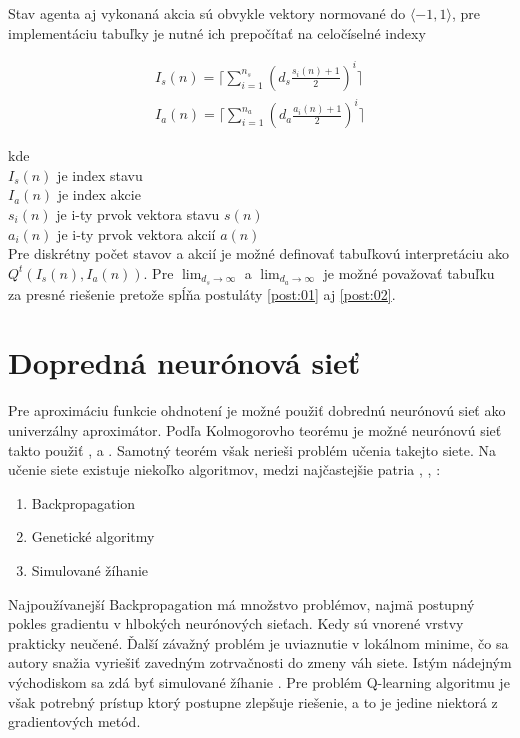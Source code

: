 Stav agenta aj vykonaná akcia sú obvykle vektory normované do $\langle -1, 1 \rangle$,
pre implementáciu tabuľky je nutné ich prepočítať na celočíselné indexy

\begin{align}
  I_s(n) = \lceil \sum\limits_{i=1}^{n_s} {\left( d_s\frac{s_i(n) + 1}{2} \right)^i \rceil}  \\
  I_a(n) = \lceil \sum\limits_{i=1}^{n_a} {\left( d_a\frac{a_i(n) + 1}{2} \right)^i \rceil}
\end{align}

kde \\
$I_s(n)$ je index stavu \\
$I_a(n)$ je index akcie \\
$s_i(n)$ je i-ty prvok vektora stavu $s(n)$ \\
$a_i(n)$ je i-ty prvok vektora akcií $a(n)$ \\

Pre diskrétny počet stavov a akcií je možné definovať tabuľkovú interpretáciu ako
$Q^t(I_s(n), I_a(n))$.
Pre $\lim_{d_s\to\infty}$ a $\lim_{d_a\to\infty}$ je možné považovať tabuľku za presné riešenie
pretože spĺňa postuláty \ref{post:01} aj \ref{post:02}.

\section{Dopredná neurónová sieť}

Pre aproximáciu funkcie ohdnotení je možné použiť dobrednú neurónovú sieť ako
univerzálny aproximátor. Podľa Kolmogorovho teorému je možné neurónovú sieť
takto použiť \cite{bib:kolomongorov_01}, \cite{bib:kolomongorov_02} a \cite{bib:kolomongorov_03}.
Samotný teorém však nerieši problém učenia takejto siete. Na učenie siete
existuje niekoľko algoritmov, medzi najčastejšie patria
\cite{bib:backpropagation_00}, \cite{bib:backpropagation_01}, \cite{bib:backpropagation_02} :

\begin{enumerate}
 \item Backpropagation
 \item Genetické algoritmy
 \item Simulované žíhanie
\end{enumerate}

Najpoužívanejší Backpropagation má množstvo problémov, najmä postupný pokles gradientu
v hlbokých neurónových sieťach. Kedy sú vnorené vrstvy prakticky neučené. Ďalší závažný problém
je uviaznutie v lokálnom minime, čo sa autory snažia vyriešiť zavedným zotrvačnosti
do zmeny váh siete. Istým nádejným východiskom sa zdá byť simulované žíhanie \cite{bib:annealing_01}.
Pre problém Q-learning algoritmu je však potrebný prístup ktorý postupne zlepšuje riešenie,
a to je jedine niektorá z gradientových metód.

